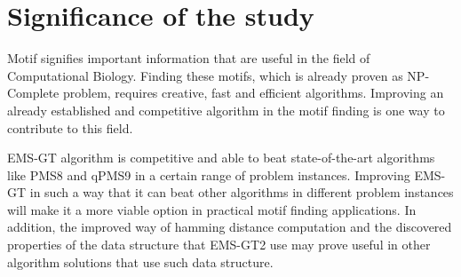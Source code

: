 \section{Significance of the study}
Motif signifies important information that are useful in the field of Computational Biology. Finding these motifs, which is already proven as NP-Complete problem, requires creative, fast and efficient algorithms. Improving an already established and competitive algorithm in the motif finding is one way to contribute to this field.

EMS-GT algorithm is competitive and able to beat state-of-the-art algorithms like PMS8 and qPMS9 in a certain range of problem instances. Improving EMS-GT in such a way that it can beat other algorithms in different problem instances will make it a more viable option in practical motif finding applications. In addition, the improved way of hamming distance computation and the discovered properties of the data structure that EMS-GT2 use may prove useful in other algorithm solutions that use such data structure.
